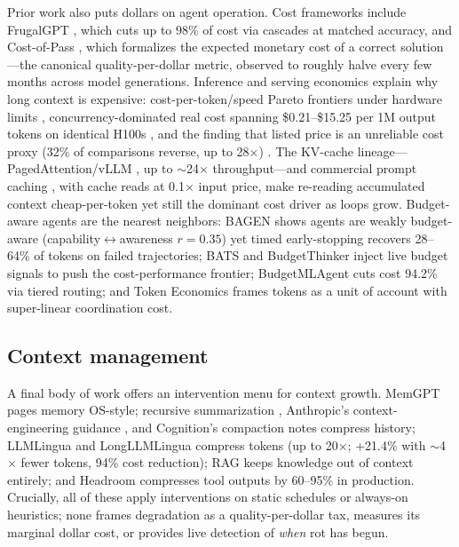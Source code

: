 \documentclass[11pt]{article}
\begin{document}
Prior work also puts dollars on agent operation. Cost frameworks include
FrugalGPT \cite{chen2023frugalgpt}, which cuts up to 98\% of cost via cascades
at matched accuracy, and Cost-of-Pass \cite{erol2025costofpass}, which
formalizes the expected monetary cost of a correct solution---the canonical
quality-per-dollar metric, observed to roughly halve every few months across
model generations. Inference and serving economics explain why long context is
expensive: cost-per-token/speed Pareto frontiers under hardware limits
\cite{erdil2025inference}, concurrency-dominated real cost spanning
\$0.21--\$15.25 per 1M output tokens on identical H100s
\cite{patil2026beyondtoken}, and the finding that listed price is an
unreliable cost proxy (32\% of comparisons reverse, up to 28$\times$)
\cite{chen2026pricereversal}. The KV-cache lineage---PagedAttention/vLLM
\cite{kwon2023pagedattention}, up to $\sim$24$\times$ throughput---and
commercial prompt caching \cite{anthropic2026promptcaching}, with cache reads
at 0.1$\times$ input price, make re-reading accumulated context
cheap-per-token yet still the dominant cost driver as loops grow. Budget-aware
agents are the nearest neighbors: BAGEN \cite{lin2026bagen} shows agents are
weakly budget-aware (capability$\leftrightarrow$awareness $r = 0.35$) yet
timed early-stopping recovers 28--64\% of tokens on failed trajectories; BATS
\cite{liu2025bats} and BudgetThinker \cite{wen2025budgetthinker} inject live
budget signals to push the cost-performance frontier; BudgetMLAgent
\cite{gandhi2024budgetmlagent} cuts cost 94.2\% via tiered routing; and Token
Economics \cite{chen2026tokeneconomics} frames tokens as a unit of account
with super-linear coordination cost.

\subsection{Context management}
\label{sec:rw-context-mgmt}

A final body of work offers an intervention menu for context growth. MemGPT
\cite{packer2023memgpt} pages memory OS-style; recursive summarization
\cite{wang2023recursive}, Anthropic's context-engineering guidance
\cite{rajasekaran2025contextengineering}, and Cognition's compaction notes
\cite{yan2025dontbuild} compress history; LLMLingua \cite{jiang2023llmlingua}
and LongLLMLingua \cite{jiang2024longllmlingua} compress tokens (up to
20$\times$; +21.4\% with $\sim$4$\times$ fewer tokens, 94\% cost reduction);
RAG \cite{lewis2020rag} keeps knowledge out of context entirely; and Headroom
\cite{chopra2026headroom} compresses tool outputs by 60--95\% in production.
Crucially, all of these apply interventions on static schedules or always-on
heuristics; none frames degradation as a quality-per-dollar tax, measures its
marginal dollar cost, or provides live detection of \emph{when} rot has begun.
\end{document}
